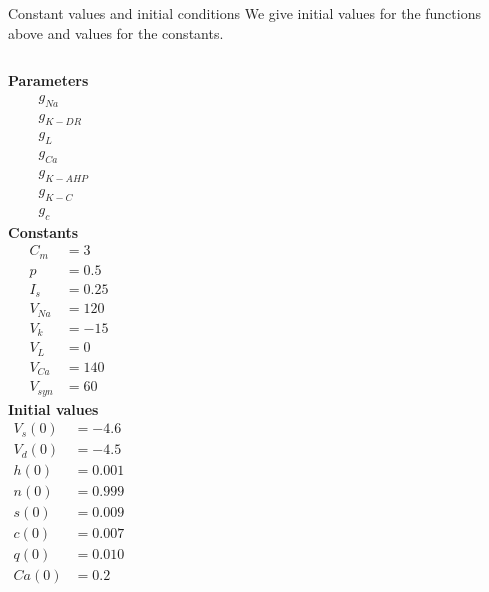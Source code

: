    
\begin{frame}{Constant values and initial conditions}
    We give initial values for the functions above and values for the constants. 
    \begin{columns}
        \textbf{Parameters}
        \begin{align*}
            g_{Na} &\\
            g_{K-DR} &\\
            g_{L} &\\
            g_{Ca} &\\
            g_{K-AHP} &\\
            g_{K-C} &\\
            g_c &
        \end{align*}
        \textbf{Constants}
        \begin{align*}
            C_m &= 3\\
            p &= 0.5\\
            I_s &= 0.25\\
            V_{Na} &= 120\\
            V_{k} &= -15\\
            V_{L} &= 0\\
            V_{Ca} &= 140\\
            V_{syn} &= 60
        \end{align*}
        \textbf{Initial values}
        \begin{align*}
            V_s(0) &= -4.6\\
            V_d(0) &= -4.5\\
            h(0) &= 0.001\\
            n(0) &= 0.999\\
            s(0) &= 0.009\\
            c(0) &= 0.007\\
            q(0) &= 0.010\\
            Ca(0) &= 0.2
        \end{align*}
    \end{columns}
\end{frame}

